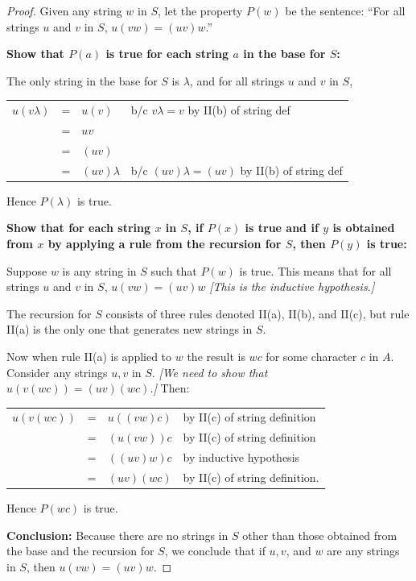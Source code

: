 \documentclass[14pt]{extarticle}
\newcommand{\cy}{\color{cyan}}
\begin{document}
\begin{proof}
Given any string $w$ in $S$, let the property $P(w)$ be the sentence: 
``For all strings $u$ and $v$ in $S$, \(u(vw) = (uv)w\).''

{\bf Show that $P(a)$ is true for each string $a$ in the base for $S$:}

The only string in the base for $S$ is $\lambda$, and for all strings $u$ and $v$ in $S$, 
\begin{center}
\begin{tabular}{rcll}
\(u(v \lambda)\) & = & \(u(v)\) & {\cy b/c $v \lambda = v$ by II(b) of string def} \\
& = & \(uv\) & \\
& = & \((uv)\) & \\
& = & \((uv) \lambda\) & {\cy b/c $(uv) \lambda = (uv)$ by II(b) of string def}
\end{tabular}
\end{center}
Hence $P(\lambda)$ is true. 

{\bf Show that for each string $x$ in $S$, if $P(x)$ is true and if $y$ is obtained from $x$ by applying a rule 
from the recursion for $S$, then $P(y)$ is true:}

Suppose $w$ is any string in $S$ such that $P(w)$ is true. This means that for all strings $u$ and $v$ in $S$, 
\(u(vw) = (uv)w\) {\it [This is the inductive hypothesis.]}

The recursion for $S$ consists of three rules denoted II(a), II(b), and II(c), but rule II(a) is the only one 
that generates new strings in $S$.

Now when rule II(a) is applied to $w$ the result is $wc$ for some character $c$ in $A$. Consider any strings $u, v$ in $S$. {\it [We need to show that \(u(v(wc)) = (uv)(wc)\).]} Then:
\begin{center}
\begin{tabular}{rcll}
\(u(v(wc))\) & = & \(u((vw)c)\) & {\cy by II(c) of string definition} \\
& = & \((u(vw))c\) & {\cy by II(c) of string definition} \\
& = & \(((uv)w)c\) & {\cy by inductive hypothesis} \\
& = & \((uv)(wc)\) & {\cy by II(c) of string definition.}
\end{tabular}
\end{center}
Hence $P(wc)$ is true.

{\bf Conclusion:} Because there are no strings in $S$ other than those obtained from the base and the recursion for 
$S$, we conclude that if $u, v$, and $w$ are any strings in $S$, then \(u(vw) = (uv)w\).
\end{proof}
\end{document}
